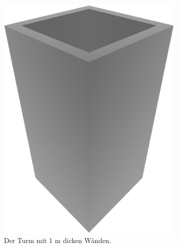 \begin{figure}[ht!]
  \hspace*{\fill}%
  \begin{subfigure}[b]{0.3\columnwidth}
    \includegraphics[width=\columnwidth]{fig/render_base_thin.png}
    \caption{Der Turm mit 1 m dicken Wänden.}\label{fig:poc:render_crossbond}
  \end{subfigure}
  \hfill%
  \begin{subfigure}[b]{0.3\columnwidth}

\end{subfigure}
\end{figure}
